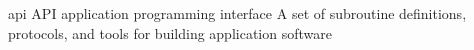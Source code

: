 \newglsXacronym%
{api}%
{API}%
{application programming interface}%
{A set of subroutine definitions, protocols, and tools for building application software}%